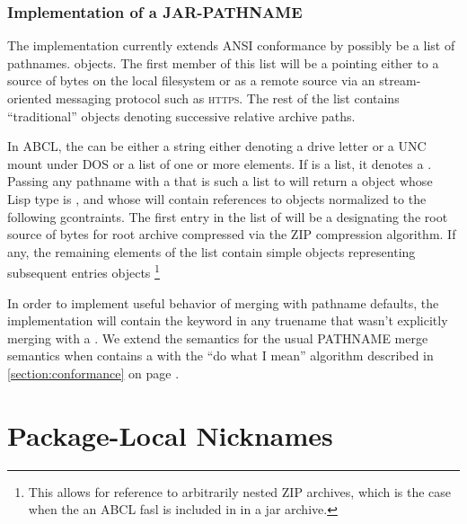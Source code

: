\documentclass[10pt]{book}
\begin{document}
\label{sec:jar-pathname}

\label{EXTENSIONS:JAR-PATHNAME}

\subsubsection{Implementation of a JAR-PATHNAME}
  The implementation currently extends \textsc{ANSI} conformance by
   possibly be a list of pathnames.  objects.  The first
  member of this list will be a  pointing either to a
  source of bytes on the local filesystem or as a remote source via an
  stream-oriented messaging protocol such as \textsc{https}.  The rest
  of the list contains ``traditional''  objects
  denoting successive relative archive paths.

  In \textsc{ABCL}, the  can be either a string either
  denoting a drive letter or a UNC mount under \textsc{DOS} or a list
  of one or more elements.  If  is a list, it denotes a
  .  Passing any pathname with a 
  that is such a list to  will return a object whose
  Lisp type is , and whose  will
  contain references to objects normalized to the following
  gcontraints.  The first entry in the  list of
   will be a 
  designating the root source of bytes for root archive compressed via
  the ZIP compression algorithm.  If any, the remaining elements of
  the list contain simple  objects representing
  subsequent entries objects \footnote{This allows for reference to
  arbitrarily nested ZIP archives, which is the case when the an ABCL
  fasl is included in in a jar archive.}


  In order to implement useful behavior of merging with pathname
  defaults, the implementation will contain the 
  keyword in any truename that wasn't explicitly merging with a
  .  We extend the semantics for the usual
  PATHNAME merge semantics when 
  contains a  with the ``do what I mean''
  algorithm described in \ref{section:conformance} on page
  \pageref{section:conformance}.


\section{Package-Local Nicknames}
\label{sec:package-local-nicknames}
\end{document}
